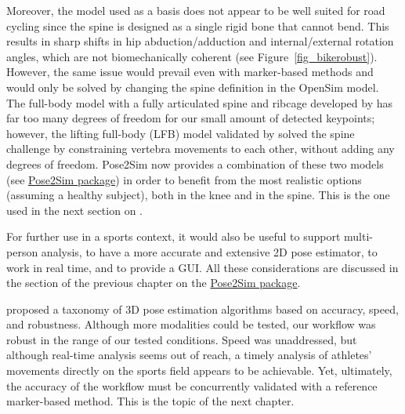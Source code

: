 Moreover, the \cite{Rajagopal2016} model used as a basis does not appear to be well suited for road cycling since the spine is designed as a single rigid bone that cannot bend. This results in sharp shifts in hip abduction/adduction and internal/external rotation angles, which are not biomechanically coherent (see Figure~\ref{fig_bikerobust}). However, the same issue would prevail even with marker-based methods and would only be solved by changing the spine definition in the OpenSim model. The full-body model with a fully articulated spine and ribcage developed by \cite{Bruno2015} has far too many degrees of freedom for our small amount of detected keypoints; however, the lifting full-body (LFB) model validated by \cite{Beaucage-Gauvreau2019} solved the spine challenge by constraining vertebra movements to each other, without adding any degrees of freedom. Pose2Sim now provides a combination of these two models (see \hyperref[ch:3]{Pose2Sim package}) in order to benefit from the most realistic options (assuming a healthy subject), both in the knee and in the spine. This is the one used in the next section on .

For further use in a sports context, it would also be useful to support multi-person analysis, to have a more accurate and extensive 2D pose estimator, to work in real time, and to provide a GUI. All these considerations are discussed in the  section of the previous chapter on the \hyperref[ch:3]{Pose2Sim package}.

\cite{Desmarais2021} proposed a taxonomy of 3D pose estimation algorithms based on accuracy, speed, and robustness. Although more modalities could be tested, our workflow was robust in the range of our tested conditions. Speed was unaddressed, but although real-time analysis seems out of reach, a timely analysis of athletes' movements directly on the sports field appears to be achievable. Yet, ultimately, the accuracy of the workflow must be concurrently validated with a reference marker-based method. This is the topic of the next chapter.